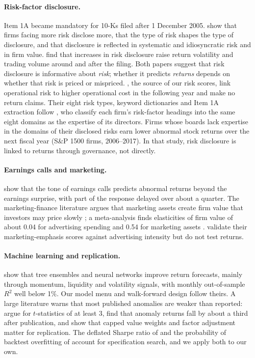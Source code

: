 \documentclass[11pt,a4paper]{article}
\begin{document}
\paragraph{Risk-factor disclosure.} Item 1A became mandatory for 10-Ks filed after 1 December 2005.
\citet{campbell2014} show that firms facing more risk disclose more, that the type of risk shapes the type of disclosure,
and that disclosure is reflected in systematic and idiosyncratic risk and in firm value. \citet{kravet2013} find that
increases in risk disclosure raise return volatility and trading volume around and after the filing. Both papers
suggest that risk disclosure is informative about \emph{risk}; whether it predicts \emph{returns} depends on whether that
risk is priced or mispriced. \citet{astvansh2026}, the source of our risk scores, link operational risk to higher
operational cost in the following year and make no return claims. Their eight risk types, keyword dictionaries and
Item 1A extraction follow \citet{schnatterly2021}, who classify each firm's risk-factor headings into the same eight domains
as the expertise of its directors. Firms whose boards lack expertise in the domains of their disclosed risks earn lower
abnormal stock returns over the next fiscal year (S\&P 1500 firms, 2006--2017). In that study, risk disclosure is linked to
returns through governance, not directly.

\paragraph{Earnings calls and marketing.} \citet{price2012} show that the tone of earnings calls predicts abnormal returns
beyond the earnings surprise, with part of the response delayed over about a quarter. The marketing-finance literature
argues that marketing assets create firm value that investors may price slowly \citep{srinivasan2009}; a meta-analysis
finds elasticities of firm value of about 0.04 for advertising spending and 0.54 for marketing assets
\citep{edeling2016}. \citet{damavandi2025} validate their marketing-emphasis scores against advertising intensity but do
not test returns.

\paragraph{Machine learning and replication.} \citet{gkx2020} show that tree ensembles and neural networks improve
return forecasts, mainly through momentum, liquidity and volatility signals, with monthly out-of-sample $R^2$ well below
1\%. Our model menu and walk-forward design follow theirs. A large literature warns that most published anomalies are
weaker than reported: \citet{hlz2016} argue for $t$-statistics of at least 3, \citet{mclean2016} find that anomaly returns
fall by about a third after publication, and \citet{jkp2023} show that capped value weights and factor adjustment matter
for replication. The deflated Sharpe ratio of \citet{bailey2014} and the probability of backtest overfitting of
\citet{bailey2017} account for specification search, and we apply both to our own.
\end{document}
